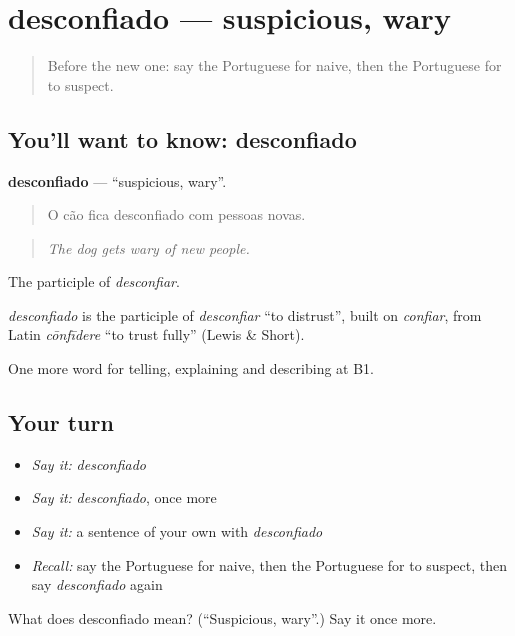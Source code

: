 \section[desconfiado]{desconfiado — suspicious, wary}

\label{lesson:PT-C472-desconfiado}



\begin{quote}
Before the new one: say the Portuguese for naive, then the Portuguese for to suspect.
\end{quote}

\subsection*{You'll want to know: desconfiado}
\textbf{desconfiado} — \textquotedblleft{}suspicious, wary\textquotedblright{}.

\begin{quote}
O cão fica desconfiado com pessoas novas.
\end{quote}

\begin{quote}
\emph{The dog gets wary of new people.}
\end{quote}

The participle of \emph{desconfiar}.

\begin{cousinweb}
\emph{desconfiado} is the participle of \emph{desconfiar} \textquotedblleft{}to distrust\textquotedblright{}, built on \emph{confiar}, from Latin \emph{cōnfīdere} \textquotedblleft{}to trust fully\textquotedblright{} (Lewis \& Short).
\end{cousinweb}

\begin{grammarlens}[title={What you've built}]
One more word for telling, explaining and describing at B1.
\end{grammarlens}

\subsection*{Your turn}
\begin{itemize}
\raggedright
  \item \emph{Say it:} \emph{desconfiado}
  \item \emph{Say it:} \emph{desconfiado}, once more
  \item \emph{Say it:} a sentence of your own with \emph{desconfiado}
  \item \emph{Recall:} say the Portuguese for naive, then the Portuguese for to suspect, then say \emph{desconfiado} again
\end{itemize}

\begin{tcolorbox}[breakable,colback=teal!4,colframe=teal!35!black,title={Before you move on}]
What does desconfiado mean? (\textquotedblleft{}Suspicious, wary\textquotedblright{}.) Say it once more.
\end{tcolorbox}
